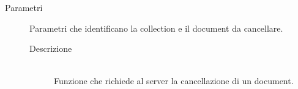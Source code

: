 \begin{description}
\begin{mldescription}
  \begin{description}
  	\item[Parametri]
  		\begin{mldescription}
        Parametri che identificano la collection e il document da cancellare.
  		\end{mldescription}
 	\begin{description} 	
  	\item[Descrizione] \hfill \\
    Funzione che richiede al server la cancellazione di un document.
    \end{description}
  \end{description}
 \end{mldescription}
\end{description}

